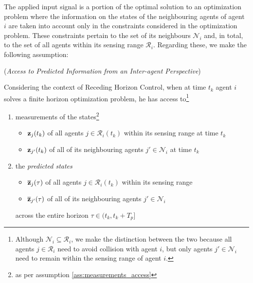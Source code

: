 The applied input signal is a portion of the optimal solution to an
optimization problem where the information on the states of the neighbouring
agents of agent $i$ are taken into account only in the constraints considered
in the optimization problem. These constraints pertain to the set of its
neighbours $\mathcal{N}_i$ and, in total, to the set of all agents within its
sensing range $\mathcal{R}_i$. Regarding these, we make the following assumption:

\begin{gg_box}
  \begin{assumption} (\textit{Access to Predicted Information from an
    Inter-agent Perspective})
    \label{ass:access_to_predicted_info_n}

Considering the context of Receding Horizon Control, when
at time $t_k$ agent $i$ solves a finite horizon optimization problem, he has
access to\footnote{Although
  $\mathcal{N}_i \subseteq \mathcal{R}_i$, we make the distinction between
  the two because all agents $j \in \mathcal{R}_i$ need to avoid collision
  with agent $i$, but only agents $j' \in \mathcal{N}_i$ need to remain
  within the sensing range of agent $i$.
}

\begin{enumerate}
  \item measurements of the states\footnote{as per assumption
    \eqref{ass:measurements_access}}
    \begin{itemize}
      \item $\bm{\mathbf{z}}_j(t_k)$ of all agents $j \in \mathcal{R}_i(t_k)$ within its sensing range at time $t_k$
      \item $\bm{\mathbf{z}}_{j'}(t_k)$ of all of its neighbouring agents $j' \in \mathcal{N}_i$ at time $t_k$
      \end{itemize}
    \item the \textit{predicted states}
      \begin{itemize}
        \item $\overline{\bm{\mathbf{z}}}_j(\tau)$ of all agents $j \in \mathcal{R}_i(t_k)$ within its sensing range
        \item $\overline{\bm{\mathbf{z}}}_{j'}(\tau)$ of all of its neighbouring agents $j' \in \mathcal{N}_i$
      \end{itemize}
      across the entire horizon $\tau \in (t_k, t_k + T_p]$
\end{enumerate}
\end{assumption}
\end{gg_box}
